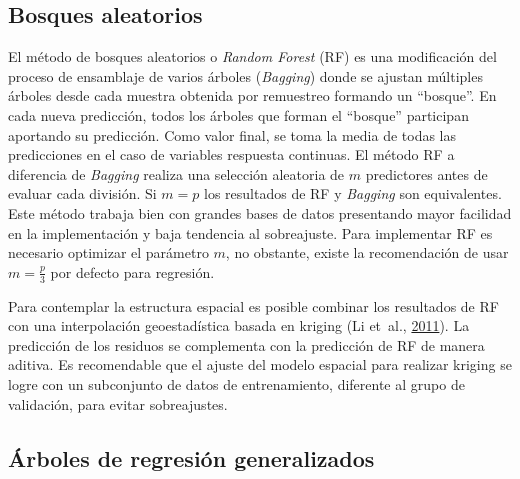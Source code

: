 \documentclass[11pt,b5paper,]{krantz}
\begin{document}
\hypertarget{bosques-aleatorios}{%
\subsection{Bosques aleatorios}\label{bosques-aleatorios}}

El método de bosques aleatorios o \emph{Random Forest} (RF) es una modificación del proceso de ensamblaje de varios árboles (\emph{Bagging}) donde se ajustan múltiples árboles desde cada muestra obtenida por remuestreo formando un ``bosque''. En cada nueva predicción, todos los árboles que forman el ``bosque'' participan aportando su predicción. Como valor final, se toma la media de todas las predicciones en el caso de variables respuesta continuas. El método RF a diferencia de \emph{Bagging} realiza una selección aleatoria de \(m\) predictores antes de evaluar cada división. Si \(m=p\) los resultados de RF y \emph{Bagging} son equivalentes. Este método trabaja bien con grandes bases de datos presentando mayor facilidad en la implementación y baja tendencia al sobreajuste. Para implementar RF es necesario optimizar el parámetro \(m\), no obstante, existe la recomendación de usar \(m=\frac{p}{3}\) por defecto para regresión.

Para contemplar la estructura espacial es posible combinar los resultados de RF con una interpolación geoestadística basada en kriging (Li et~al., \protect\hyperlink{ref-Li_Heap_Potter_Daniell_2011}{2011}). La predicción de los residuos se complementa con la predicción de RF de manera aditiva. Es recomendable que el ajuste del modelo espacial para realizar kriging se logre con un subconjunto de datos de entrenamiento, diferente al grupo de validación, para evitar sobreajustes.

\hypertarget{uxe1rboles-de-regresiuxf3n-generalizados}{%
\subsection{Árboles de regresión generalizados}\label{uxe1rboles-de-regresiuxf3n-generalizados}}
\end{document}
